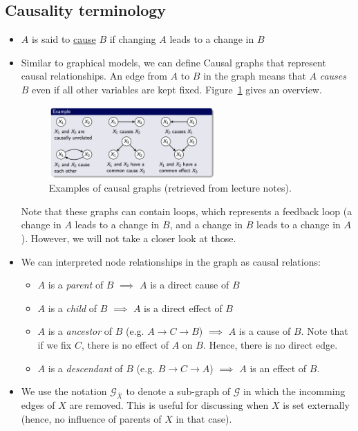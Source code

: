 \subsection{Causality terminology}
\begin{itemize}
	\item $A$ is said to \underline{cause} $B$ if changing $A$ leads to a change in $B$
	\item Similar to graphical models, we can define Causal graphs that represent causal relationships. An edge from $A$ to $B$ in the graph means that $A$ \textit{causes} $B$ even if all other variables are kept fixed. Figure~\ref{fig:causality_overview_causal_graphs} gives an overview.
	
	\begin{figure}[ht!]
		\centering
		\includegraphics[width=0.6\textwidth]{figures/causality_overview_causal_graphs.png}
		\caption{Examples of causal graphs (retrieved from lecture notes).}
		\label{fig:causality_overview_causal_graphs}
	\end{figure}
	
	Note that these graphs can contain loops, which represents a feedback loop (a change in $A$ leads to a change in $B$, and a change in $B$ leads to a change in $A$). However, we will not take a closer look at those.
	
	\item We can interpreted node relationships in the graph as causal relations:
	\begin{itemize}
		\item $A$ is a \textit{parent} of $B$ $\implies$ $A$ is a direct cause of $B$
		\item $A$ is a \textit{child} of $B$ $\implies$ $A$ is a direct effect of $B$
		\item $A$ is a \textit{ancestor} of $B$ (e.g. $A\to C \to B$) $\implies$ $A$ is a cause of $B$. Note that if we fix $C$, there is no effect of $A$ on $B$. Hence, there is no direct edge.
		\item $A$ is a \textit{descendant} of $B$ (e.g. $B\to C\to A$) $\implies$ $A$ is an effect of $B$.
	\end{itemize}
	\item We use the notation $\mathcal{G}_{\overline{X}}$ to denote a sub-graph of $\mathcal{G}$ in which the incomming edges of $X$ are removed. This is useful for discussing when $X$ is set externally (hence, no influence of parents of $X$ in that case).
	

\end{itemize}
